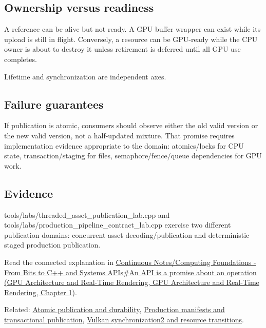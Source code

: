 \subsection{Ownership versus readiness}\label{appendix-fdae7ff0a23f-ownership-versus-readiness}

A reference can be alive but not ready. A GPU buffer wrapper can exist while its upload is still in flight. Conversely, a resource can be GPU-ready while the CPU owner is about to destroy it unless retirement is deferred until all GPU use completes.

Lifetime and synchronization are independent axes.

\subsection{Failure guarantees}\label{appendix-fdae7ff0a23f-failure-guarantees}

If publication is atomic, consumers should observe either the old valid version or the new valid version, not a half-updated mixture. That promise requires implementation evidence appropriate to the domain: atomics/locks for CPU state, transaction/staging for files, semaphore/fence/queue dependencies for GPU work.

\subsection{Evidence}\label{appendix-fdae7ff0a23f-evidence}

tools/labs/threaded\_asset\_publication\_lab.cpp and tools/labs/production\_pipeline\_contract\_lab.cpp exercise two different publication domains: concurrent asset decoding/publication and deterministic staged production publication.

Read the connected explanation in \href{../06-GPU-Architecture-and-Real-Time-Rendering/main.pdf\#nameddest=01-foundations-i-ch008-an-api-is-a-promise-about-an-operation}{Continuous Notes/Computing Foundations - From Bits to C++ and Systems APIs\#An API is a promise about an operation (GPU Architecture and Real-Time Rendering, GPU Architecture and Real-Time Rendering, Chapter 1)}.

Related: \hyperref[appendix-e89a8f290ef5]{Atomic publication and durability}, \hyperref[appendix-91eaa3cbdbc3]{Production manifests and transactional publication}, \hyperref[appendix-f15ce0d9c170]{Vulkan synchronization2 and resource transitions}.
